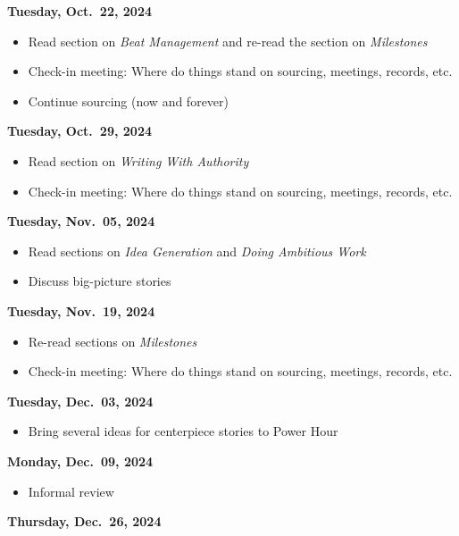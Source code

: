 \documentclass[
  11pt,
  american,
  letterpaperpaper,
  extrafontsizes,onecolumn,openright
  ]{memoir}
\providecommand{\tightlist}{%
  \setlength{\itemsep}{0pt}\setlength{\parskip}{0pt}}
\begin{document}
\textbf{Tuesday, Oct.~22, 2024}

\begin{itemize}
\tightlist
\item
  Read section on \emph{Beat Management} and re-read the section on \emph{Milestones}
\item
  Check-in meeting: Where do things stand on sourcing, meetings, records, etc.
\item
  Continue sourcing (now and forever)
\end{itemize}

\textbf{Tuesday, Oct.~29, 2024}

\begin{itemize}
\tightlist
\item
  Read section on \emph{Writing With Authority}
\item
  Check-in meeting: Where do things stand on sourcing, meetings, records, etc.
\end{itemize}

\textbf{Tuesday, Nov.~05, 2024}

\begin{itemize}
\tightlist
\item
  Read sections on \emph{Idea Generation} and \emph{Doing Ambitious Work}
\item
  Discuss big-picture stories
\end{itemize}

\textbf{Tuesday, Nov.~19, 2024}

\begin{itemize}
\tightlist
\item
  Re-read sections on \emph{Milestones}
\item
  Check-in meeting: Where do things stand on sourcing, meetings, records, etc.
\end{itemize}

\textbf{Tuesday, Dec.~03, 2024}

\begin{itemize}
\tightlist
\item
  Bring several ideas for centerpiece stories to Power Hour
\end{itemize}

\textbf{Monday, Dec.~09, 2024}

\begin{itemize}
\tightlist
\item
  Informal review
\end{itemize}

\textbf{Thursday, Dec.~26, 2024}
\end{document}

